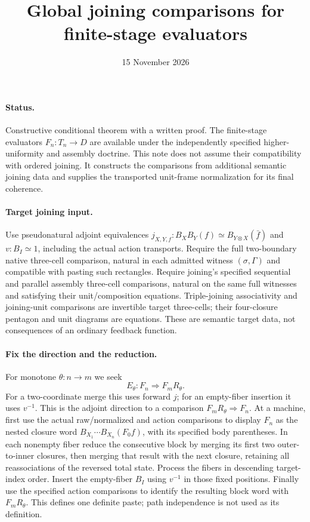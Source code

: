 \documentclass{article}
\title{Global joining comparisons for finite-stage evaluators}
\date{15 November 2026}
\begin{document}
\maketitle
\paragraph{Status.} Constructive conditional theorem with a written proof. The finite-stage evaluators $F_n:T_n\to D$ are available under the independently specified higher-uniformity and assembly doctrine. This note does not assume their compatibility with ordered joining. It constructs the comparisons from additional semantic joining data and supplies the transported unit-frame normalization for its final coherence.

\paragraph{Target joining input.} Use pseudonatural adjoint equivalences
$j_{X,Y,f}:B_XB_Y(f)\simeq B_{Y\otimes X}(\bar f)$ and $v:B_I\simeq1$, including the actual action transports. Require the full two-boundary native three-cell comparison, natural in each admitted witness $(\sigma,\Gamma)$ and compatible with pasting such rectangles. Require joining's specified sequential and parallel assembly three-cell comparisons, natural on the same full witnesses and satisfying their unit/composition equations. Triple-joining associativity and joining-unit comparisons are invertible target three-cells; their four-closure pentagon and unit diagrams are equations. These are semantic target data, not consequences of an ordinary feedback function.

\paragraph{Fix the direction and the reduction.} For monotone $\theta:n\to m$ we seek
\[
 E_\theta:F_n\Longrightarrow F_mR_\theta.
\]
For a two-coordinate merge this uses forward $j$; for an empty-fiber insertion it uses $v^{-1}$. This is the adjoint direction to a comparison $F_mR_\theta\Rightarrow F_n$. At a machine, first use the actual raw/normalized and action comparisons to display $F_n$ as the nested closure word $B_{X_1}\cdots B_{X_n}(F_0f)$, with its specified body parentheses. In each nonempty fiber reduce the consecutive block by merging its first two outer-to-inner closures, then merging that result with the next closure, retaining all reassociations of the reversed total state. Process the fibers in descending target-index order. Insert the empty-fiber $B_I$ using $v^{-1}$ in those fixed positions. Finally use the specified action comparisons to identify the resulting block word with $F_mR_\theta$. This defines one definite paste; path independence is not used as its definition.
\end{document}
